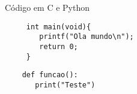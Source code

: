 \begin{frame}[fragile]{Código em C e Python}
    \ansic
	\begin{lstlisting}
	 int main(void){
	    printf("Ola mundo\n");
	    return 0;
	 }
	\end{lstlisting}

    \python
	\begin{lstlisting}
	def funcao():
	   print("Teste")
	\end{lstlisting}	
	
\end{frame}

